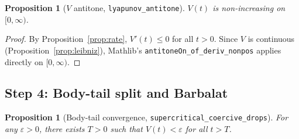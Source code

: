 \documentclass[11pt,a4paper]{article}
\newtheorem{proposition}[theorem]{Proposition}
\theoremstyle{definition}
\begin{document}
\begin{proposition}[$V$ antitone, \texttt{lyapunov\_antitone}]\label{prop:antitone}
$V(t)$ is non-increasing on $[0,\infty)$.
\end{proposition}

\begin{proof}
By Proposition~\ref{prop:rate}, $V'(t) \leq 0$ for all $t > 0$. Since $V$ is continuous (Proposition~\ref{prop:leibniz}), Mathlib's \texttt{antitoneOn\_of\_deriv\_nonpos} applies directly on $[0,\infty)$.
\end{proof}

\subsection{Step 4: Body-tail split and Barbalat}

\begin{proposition}[Body-tail convergence, \texttt{supercritical\_coercive\_drops}]\label{prop:drop}
For any $\varepsilon > 0$, there exists $T > 0$ such that $V(t) < \varepsilon$ for all $t > T$.
\end{proposition}
\end{document}
